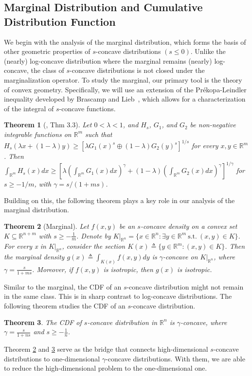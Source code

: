 \documentclass[11pt]{article}
\newcommand{\R}{\mathbb{R}}
\newtheorem{theorem}{Theorem}
\begin{document}
\subsection{Marginal Distribution and Cumulative Distribution Function}
We begin with the analysis of the marginal distribution, which forms the basis of other geometric properties of $s$-concave distributions $(s\le 0)$. Unlike the (nearly) log-concave distribution where the marginal remains (nearly) log-concave, the class of $s$-concave distributions is not closed under the marginalization operator. To study the marginal, our primary tool is the theory of convex geometry. Specifically, we will use an extension of the Pr{\'e}kopa-Leindler inequality developed by Brascamp and Lieb~\cite{brascamp2002extensions}, which allows for a characterization of the integral of $s$-concave functions.
\begin{theorem}[\cite{brascamp2002extensions}, Thm 3.3]
\label{theorem: generalized prekopa-leindler inequality}
Let $0<\lambda<1$, and $H_s$, $G_1$, and $G_2$ be non-negative integrable functions on $\mathbb{R}^m$ such that $H_s(\lambda x+(1-\lambda) y)\ge [\lambda G_1(x)^s\oplus(1-\lambda) G_2(y)^s]^{1/s}$ for every $x,y\in\mathbb{R}^m$. Then
$
\int_{\mathbb{R}^m}H_s(x)dx\ge \left[\lambda\left(\int_{\mathbb{R}^m}G_1(x)dx\right)^\gamma+(1-\lambda)\left(\int_{\mathbb{R}^m}G_2(x)dx\right)^\gamma\right]^{1/\gamma}
$ for $s\ge -1/m$,
with $\gamma=s/(1+ms)$.
\end{theorem}


Building on this, the following theorem plays a key role in our analysis of the marginal distribution.
\begin{theorem}[Marginal]
\label{theorem: marginal}
Let $f(x,y)$ be an $s$-concave density on a convex set $K\subseteq \mathbb{R}^{n+m}$ with $s\ge -\frac{1}{m}$. Denote by $K|_{\mathbb{R}^n}=\{x\in\R^n: \exists y\in\R^m\ \mbox{s.t.}\ (x,y)\in K\}$. For every x in $K|_{\mathbb{R}^n}$, consider the section $K(x)\triangleq\{y\in\mathbb{R}^m: (x,y)\in K\}$. Then the marginal density $g(x)\triangleq\int_{K(x)}f(x,y)dy$ is $\gamma$-concave on $K|_{\mathbb{R}^n}$, where $\gamma=\frac{s}{1+ms}$. Moreover, if $f(x,y)$ is isotropic, then $g(x)$ is isotropic.
\end{theorem}


Similar to the marginal, the CDF of an $s$-concave distribution might not remain in the same class. This is in sharp contrast to log-concave distributions. The following theorem studies the CDF of an $s$-concave distribution.
\begin{theorem}
\label{theorem: distribution function}
The CDF of $s$-concave distribution in $\mathbb{R}^n$ is $\gamma$-concave, where $\gamma=\frac{s}{1+ns}$ and $s\ge -\frac{1}{n}$.
\end{theorem}
Theorem \ref{theorem: marginal} and \ref{theorem: distribution function} serve as the bridge that connects high-dimensional $s$-concave distributions to one-dimensional $\gamma$-concave distributions. With them, we are able to reduce the high-dimensional problem to the one-dimensional one.
\end{document}
